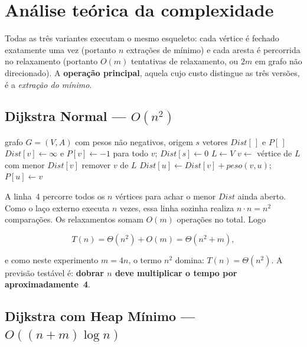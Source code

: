 \documentclass[12pt,a4paper]{article}
\begin{document}
\noindent
\section{Análise teórica da complexidade}

Todas as três variantes executam o mesmo esqueleto: cada vértice é fechado
exatamente uma vez (portanto $n$ extrações de mínimo) e cada aresta é
percorrida no relaxamento (portanto $O(m)$ tentativas de relaxamento, ou
$2m$ em grafo não direcionado). A \textbf{operação principal}, aquela cujo
custo distingue as três versões, é a \emph{extração do mínimo}.

\subsection{Dijkstra Normal --- \texorpdfstring{$O(n^2)$}{O(n2)}}

\begin{algorithm}[H]
\caption{\textsc{Dijkstra-Normal}$(G, s)$}
\begin{algorithmic}[1]
\Require grafo $G=(V,A)$ com pesos não negativos, origem $s$
\Ensure vetores $Dist[\,]$ e $P[\,]$
\State $Dist[v] \gets \infty$ e $P[v] \gets -1$ para todo $v$; \quad $Dist[s] \gets 0$
\State $L \gets V$
  \State $v \gets$ vértice de $L$ com menor $Dist[v]$ 
  \State remover $v$ de $L$
      \State $Dist[u] \gets Dist[v] + peso(v,u)$; \quad $P[u] \gets v$
    \EndIf
  \EndFor
\EndWhile
\end{algorithmic}
\end{algorithm}

A linha~4 percorre todos os $n$ vértices para achar o menor $Dist$ ainda
aberto. Como o laço externo executa $n$ vezes, essa linha sozinha realiza
$n \cdot n = n^2$ comparações. Os relaxamentos somam $O(m)$ operações no
total. Logo

\[
T(n) = \Theta(n^2) + O(m) = \Theta(n^2 + m),
\]

e como neste experimento $m = 4n$, o termo $n^2$ domina: $T(n) = \Theta(n^2)$.
A previsão testável é: \textbf{dobrar $n$ deve multiplicar o tempo por
aproximadamente~4}.

\subsection{Dijkstra com Heap Mínimo --- \texorpdfstring{$O((n+m)\log n)$}{O((n+m) log n)}}
\end{document}
